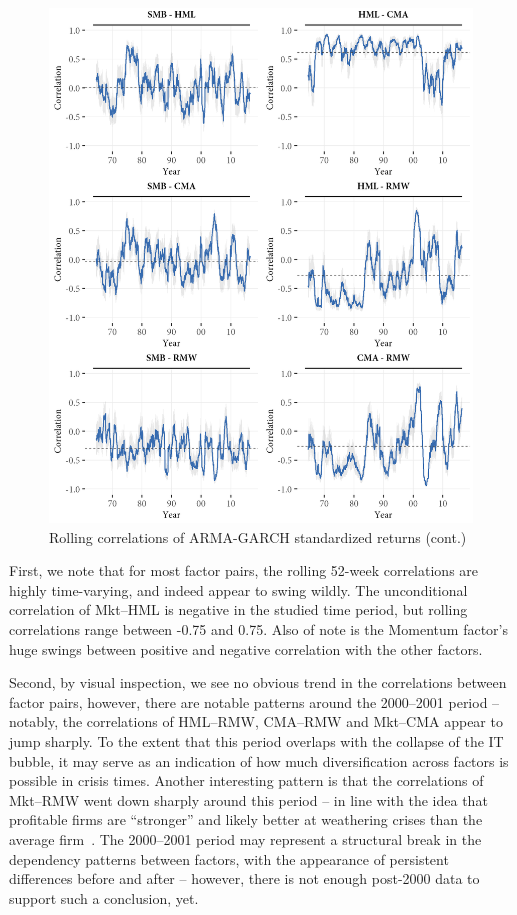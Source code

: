 \begin{figure}[!ht]
  \ContinuedFloat
  \centering
  
  \includegraphics[scale=1]{graphics/rolling2.png}  
  \caption{Rolling correlations of ARMA-GARCH standardized returns (cont.)}
\end{figure}
First, we note that for most factor pairs, the rolling 52-week correlations are highly time-varying, and indeed appear to swing wildly. The unconditional correlation of Mkt--HML is negative in the studied time period, but rolling correlations range between -0.75 and 0.75. Also of note is the Momentum factor's huge swings between positive and negative correlation with the other factors. 

Second, by visual inspection, we see no obvious trend in the correlations between factor pairs, however, there are notable patterns around the 2000--2001 period -- notably, the correlations of HML--RMW, CMA--RMW and Mkt--CMA appear to jump sharply. To the extent that this period overlaps with the collapse of the IT bubble, it may serve as an indication of how much diversification across factors is possible in crisis times. Another interesting pattern is that the correlations of Mkt--RMW went down sharply around this period -- in line with the idea that profitable firms are ``stronger'' and likely better at weathering crises than the average firm~\autocite{NovyMarx2013}. The 2000--2001 period may represent a structural break in the dependency patterns between factors, with the appearance of persistent differences before and after -- however, there is not enough post-2000 data to support such a conclusion, yet.

